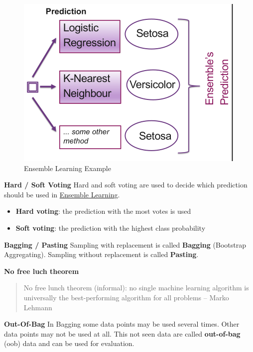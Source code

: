 \documentclass[11pt,twoside,landscape]{article}
\begin{document}
\begin{multicols}{3}
\begin{figure}[htbp]
\centering
\includegraphics[width=.9\linewidth]{img/ensemble_learning_example.png}
\caption{Ensemble Learning Example}
\end{figure}


\textbf{Hard / Soft Voting}
Hard and soft voting are used to decide which prediction should be used in \href{../../../roam/20211228090232-ensemble_learning.org}{Ensemble Learning}.
\begin{itemize}
\item \textbf{Hard voting}: the prediction with the most votes is used
\item \textbf{Soft voting}: the prediction with the highest class probability
\end{itemize}


\textbf{Bagging / Pasting}
Sampling with replacement is called \textbf{Bagging} (Bootstrap Aggregating).
Sampling without replacement is called \textbf{Pasting}.


\textbf{No free luch theorem}
\begin{quote}
No free lunch theorem (informal): no single machine learning algorithm is universally the best-performing algorithm for all problems
-- Marko Lehmann
\end{quote}


\textbf{Out-Of-Bag}
In Bagging some data points may be used several times.
Other data points may not be used at all.
This not seen data are called \textbf{out-of-bag} (oob) data and can be used for evaluation.

\end{multicols}
\end{document}
